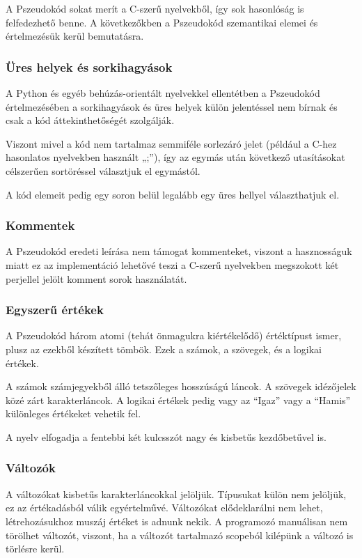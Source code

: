 A Pszeudokód sokat merít a C-szerű nyelvekből, így sok hasonlóság is felfedezhető benne. A következőkben a Pszeudokód szemantikai elemei és értelmezésük kerül bemutatásra.

\subsubsection{Üres helyek és sorkihagyások}

A Python és egyéb behúzás-orientált nyelvekkel ellentétben a Pszeudokód értelmezésében a sorkihagyások és üres helyek külön jelentéssel nem bírnak és csak a kód áttekinthetőségét szolgálják.

Viszont mivel a kód nem tartalmaz semmiféle sorlezáró jelet (például a C-hez hasonlatos nyelvekben használt „;”), így az egymás után következő utasításokat célszerűen sortöréssel választjuk el egymástól.

A kód elemeit pedig egy soron belül legalább egy üres hellyel választhatjuk el.

\subsubsection{Kommentek}
A Pszeudokód eredeti leírása nem támogat kommenteket, viszont a hasznosságuk miatt ez az implementáció lehetővé teszi a C-szerű nyelvekben megszokott két perjellel jelölt komment sorok használatát.

\subsubsection{Egyszerű értékek}
A Pszeudokód három atomi (tehát önmagukra kiértékelődő) értéktípust ismer, plusz az ezekből készített tömbök. Ezek a számok, a szövegek, és a logikai értékek.

A számok számjegyekből álló tetszőleges hosszúságú láncok. A szövegek idézőjelek közé zárt karakterláncok. A logikai értékek pedig vagy az “Igaz” vagy a “Hamis” különleges értékeket vehetik fel.

A nyelv elfogadja a fentebbi két kulcsszót nagy és kisbetűs kezdőbetűvel is.

\subsubsection{Változók}
A változókat kisbetűs karakterláncokkal jelöljük. Típusukat külön nem jelöljük, ez az értékadásból válik egyértelművé. Változókat elődeklarálni nem lehet, létrehozásukhoz muszáj értéket is adnunk nekik. A programozó manuálisan nem törölhet változót, viszont, ha a változót tartalmazó scopeból kilépünk a változó is törlésre kerül.

